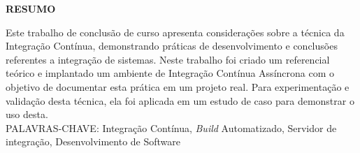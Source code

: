 \begin{center}
\textbf{RESUMO}
\end{center}
\singlespacing

\noindent Este trabalho de conclusão de curso apresenta considerações sobre a técnica da Integração Contínua, demonstrando práticas de desenvolvimento e conclusões referentes a integração de sistemas. Neste trabalho foi criado um referencial teórico e implantado um ambiente de Integração Contínua Assíncrona com o objetivo de documentar esta prática em um projeto real. Para experimentação e validação desta técnica, ela foi aplicada em um estudo de caso para demonstrar o uso desta. \\

\noindent PALAVRAS-CHAVE: Integração Contínua, \textit{Build} Automatizado, Servidor de integração, Desenvolvimento de Software
